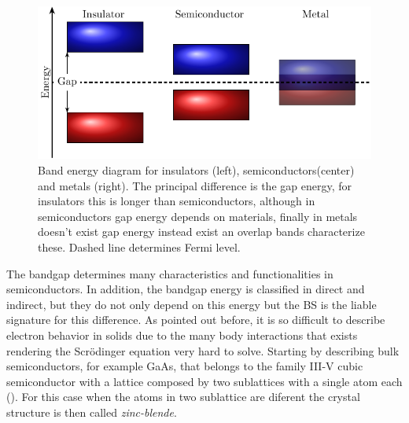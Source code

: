 \begin{figure}[h!]
	\centering
	\includegraphics[width=\linewidth]{../figures/chapter-1/solid-sort/build/solid-sort}
	\caption{Band energy diagram for insulators (left), semiconductors(center) and metals (right). The principal difference is the gap energy, for insulators this is longer than semiconductors, although in semiconductors gap energy depends on materials, finally in metals doesn't exist gap energy instead exist an overlap bands characterize these. Dashed line determines Fermi level.  }
	\label{fig:subsubsection-1.1.1-solid-types}
\end{figure}

The bandgap determines many characteristics and functionalities in semiconductors. In addition, the bandgap energy is classified in direct and indirect, but they do not only depend on this energy but the \gls{BS} is the liable signature for this difference. As pointed out before, it is so difficult to describe electron behavior in solids due to the many body interactions that exists rendering the Scr\"odinger equation very hard to solve. 
Starting by describing bulk semiconductors, for example GaAs, that belongs to the  family III-V cubic semiconductor with a lattice composed by two sublattices with a single atom each (). For this case when the atoms in two sublattice are diferent the crystal structure is then called \emph{zinc-blende}\cite{vurgaftman2020bands}.

